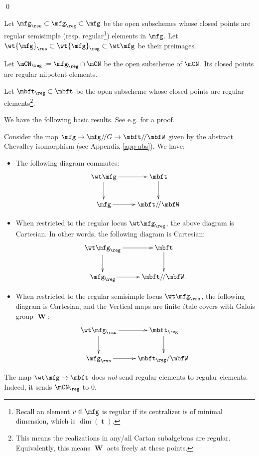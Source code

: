 	\qed

	\begin{notn}
		Let $\mfg_\rss \subset \mfg_\reg \subset \mfg$ be the open subschemes whose closed points are regular semisimple (resp. regular\footnote{Recall an element $v\in \mfg$ is regular if its centralizer is of minimal dimension, which is $\dim(\mbft)$.}) elements in $\mfg$. Let $\wt{\mfg}_\rss\subset \wt{\mfg}_\reg \subset \wt\mfg$ be their preimages.

		Let $\mCN_\reg:=\mfg_\reg\cap \mCN$ be the open subscheme of $\mCN$. Its closed points are regular nilpotent elements.

		Let $\mbft_\reg\subset \mbft$ be the open subscheme whose closed points are regular elements\footnote{This means the realizations in any/all Cartan subalgebras are regular. Equivalently, this means $\mbfW$ acts freely at these points.}.
	\end{notn}

	We have the following basic results. See e.g. \cite[Section 3.1]{CG} for a proof.

	\begin{prop}
		\label{prop-Groth-alt}
		Consider the map $\mfg \to \mfg/\!/G \to \mbft/\!/\mbfW$ given by the abstract Chevalley isomorphism (see Appendix \ref{app-abs}). We have:
		\begin{itemize}
			\item[(1)]
				The following diagram commutes:
				\[
					\xymatrix{
						\wt\mfg \ar[r] \ar[d] & \mbft \ar[d] \\
						\mfg \ar[r] & \mbft/\!/\mbfW
					}
				\]
			\item[(2)]
				When restricted to the regular locus $\wt\mfg_\reg$, the above diagram is Cartesian. In other words, the following diagram is Cartesian:
				\[
					\xymatrix{
						\wt\mfg_\reg \ar[r] \ar[d] & \mbft \ar[d] \\
						\mfg_\reg \ar[r] & \mbft/\!/\mbfW.
					}
				\]
			\item[(3)]
				When restricted to the regular semisimple locus $\wt\mfg_\rss$, the following diagram is Cartesian, and the Vertical maps are finite étale covers with Galois group $\mbfW$:
				\[
					\xymatrix{
						\wt\mfg_\rss \ar[r] \ar[d] & \mbft_\reg \ar[d] \\
						\mfg_\rss \ar[r] & \mbft_\reg/\mbfW.
					}
				\]
		\end{itemize}

	\end{prop}

	\begin{warn}
		The map $\wt\mfg \to \mbft$ does \emph{not} send regular elements to regular elements. Indeed, it sends $\mCN_\reg$ to $0$.
	\end{warn}


